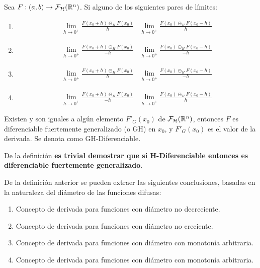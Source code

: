 \begin{definicion}
  Sea $F: (a, b) \rightarrow \mathcal{F}_\mathcal{H}(\mathbb R^n)$. Si alguno de los siguientes pares de límites:
  
  \begin{enumerate}
  \item 	
    \[
    \begin{array}{c||c}
      \lim\limits_{h \rightarrow 0^+} \frac{F(x_0 + h) \circleddash_H F(x_0)}{h} & \lim\limits_{h \rightarrow 0^+} \frac{F(x_0) \circleddash_H F(x_0 - h)}{h}
    \end{array}
    \]
  \item 	
    \[
    \begin{array}{c||c}
      \lim\limits_{h \rightarrow 0^+} \frac{F(x_0 + h) \circleddash_H F(x_0)}{-h} & \lim\limits_{h \rightarrow 0^+} \frac{F(x_0) \circleddash_H F(x_0 - h)}{-h}
    \end{array}
    \]
  \item 	
    \[
    \begin{array}{c||c}
      \lim\limits_{h \rightarrow 0^+} \frac{F(x_0 + h) \circleddash_H F(x_0)}{h} & \lim\limits_{h \rightarrow 0^+} \frac{F(x_0) \circleddash_H F(x_0 - h)}{-h}
    \end{array}
    \]
  \item 	
    \[
    \begin{array}{c||c}
      \lim\limits_{h \rightarrow 0^+} \frac{F(x_0 + h) \circleddash_H F(x_0)}{-h} & \lim\limits_{h \rightarrow 0^+} \frac{F(x_0) \circleddash_H F(x_0 - h)}{h}
    \end{array}
    \]
  \end{enumerate}
  Existen y son iguales a algún elemento $F'_G(x_0)$ de $\mathcal{F}_\mathcal{H}(\mathbb R^n)$, entonces $F$ es diferenciable fuertemente generalizado (o GH) en $x_0$, y $F'_G(x_0)$ es el valor de la derivada. Se denota como GH-Diferenciable.
\end{definicion}
De la definición \textbf{es trivial demostrar que si H-Diferenciable entonces es diferenciable fuertemente generalizado}.

\begin{observacion}
  De la definición anterior se pueden extraer las siguientes conclusiones, basadas en la naturaleza del diámetro de las funciones difusas:
  \begin{enumerate}
  \item Concepto de derivada para funciones con diámetro no decreciente.
  \item Concepto de derivada para funciones con diámetro no creciente.
  \item Concepto de derivada para funciones con diámetro con monotonía arbitraria.
  \item Concepto de derivada para funciones con diámetro con monotonía arbitraria.
  \end{enumerate}
\end{observacion} 


